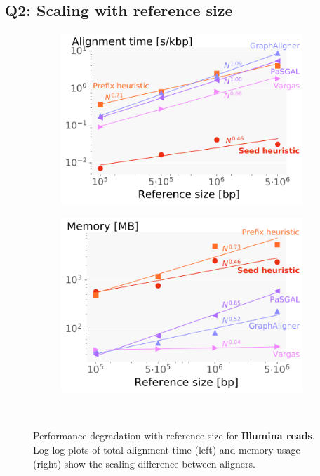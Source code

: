 \subsection{Q2: Scaling with reference size} \label{SEEDsec:eval-refsize}

\begin{figure}[t]
  \begin{subfigure}{.45\textwidth}
    \centering
    \includegraphics[width=\linewidth]{figures/illumina_spkb_vs_refsize-headxspkb.pdf}
  \end{subfigure}%
  \begin{subfigure}{.45\textwidth}
    \centering
    \includegraphics[width=\linewidth]{figures/illumina_memory_vs_refsize-headxmax_rss.pdf}
  \end{subfigure}~\hspace{1em} \caption[Performance scaling with reference size
  (short reads)]{Performance degradation with reference size for
  \textbf{Illumina reads}. Log-log plots of total alignment time (left) and
  memory usage (right) show the scaling difference between aligners.}
  \label{SEEDfig:illumina_scaling_with_genomesize}
\end{figure}

